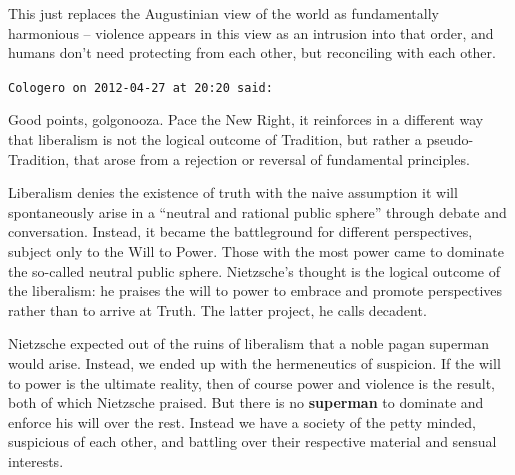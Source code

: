 \begin{footnotesize}
\begin{sffamily}
This just replaces the Augustinian view of the world as fundamentally harmonious -- violence appears in this view as an intrusion into that order, and humans don't need protecting from each other, but reconciling with each other.

\hfill

\texttt{Cologero on 2012-04-27 at 20:20 said:}

Good points, golgonooza. Pace the New Right, it reinforces in a different way that liberalism is not the logical outcome of Tradition, but rather a pseudo-Tradition, that arose from a rejection or reversal of fundamental principles.

Liberalism denies the existence of truth with the naive assumption it will spontaneously arise in a ``neutral and rational public sphere'' through debate and conversation. Instead, it became the battleground for different perspectives, subject only to the Will to Power. Those with the most power came to dominate the so-called neutral public sphere. Nietzsche's thought is the logical outcome of the liberalism: he praises the will to power to embrace and promote perspectives rather than to arrive at Truth. The latter project, he calls decadent.

Nietzsche expected out of the ruins of liberalism that a noble pagan superman would arise. Instead, we ended up with the hermeneutics of suspicion. If the will to power is the ultimate reality, then of course power and violence is the result, both of which Nietzsche praised. But there is no \textbf{superman} to dominate and enforce his will over the rest. Instead we have a society of the petty minded, suspicious of each other, and battling over their respective material and sensual interests.

\hfill

\end{sffamily}
\end{footnotesize}

